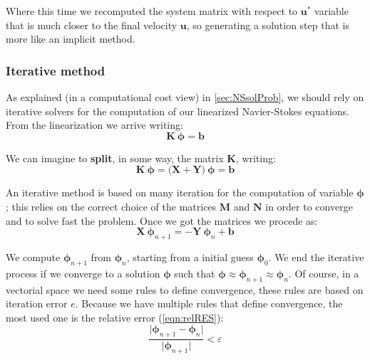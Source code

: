 \noindent Where this time we recomputed the system matrix with respect to $\boldsymbol{u}^*$ variable that is much closer to the final velocity $\boldsymbol{u}$, so generating a solution step that is more like an implicit method. 

\subsubsection{Iterative method} \label{sec:ITER}
As explained (in a computational cost view) in \ref{sec:NSsolProb}, we should rely on iterative solvers for the computation of our linearized Navier-Stokes equations. From the linearization we arrive writing:
\begin{equation}
    \boldsymbol{K} \ \boldsymbol{\phi} = \boldsymbol{b}
    \label{eqn:linsys}
\end{equation}

\noindent We can imagine to \textbf{split}, in some way, the matrix $\boldsymbol{K}$, writing:
\begin{equation}
    \boldsymbol{K} \ \boldsymbol{\phi} = \big( \boldsymbol{X} + \boldsymbol{Y} \big) \ \boldsymbol{\phi} = \boldsymbol{b}
\end{equation}

\noindent An iterative method is based on many iteration for the computation of variable $\boldsymbol{\phi}$; this relies on the correct choice of the matrices $\boldsymbol{M}$ and $\boldsymbol{N}$ in order to converge and to solve fast the problem. Once we got the matrices we procede as:
\begin{equation}
    \boldsymbol{X} \ \boldsymbol{\phi}_{n + 1} = - \boldsymbol{Y} \ \boldsymbol{\phi}_n + \boldsymbol{b}
    \label{eqn:ITER}
\end{equation}

\noindent We compute $\boldsymbol{\phi}_{n + 1}$ from $\boldsymbol{\phi}_{n}$, starting from a initial guess $\boldsymbol{\phi}_0$. We end the iterative process if we converge to a solution $\boldsymbol{\phi}$ such that $\boldsymbol{\phi} \approx \boldsymbol{\phi}_{n + 1} \approx \boldsymbol{\phi}_n$. Of course, in a vectorial space we need some rules to define convergence, these rules are based on iteration error $e$. Because we have multiple rules that define convergence, the most used one is the relative error (\ref{eqn:relRES}):
\begin{equation}
    \frac{\big| \boldsymbol{\phi}_{n + 1} - \boldsymbol{\phi}_{n} \big|}{\big| \boldsymbol{\phi}_{n + 1} \big|} < \varepsilon 
    \label{eqn:relRES}  
\end{equation}


